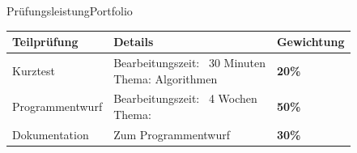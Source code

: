 \begin{frame}{Prüfungsleistung}{Portfolio}
	\begin{tabularx}{\textwidth}{|l|l|l|}
		\hline
		\textbf{Teilprüfung}&\textbf{Details}&\textbf{Gewichtung}\\
		\hline
		Kurztest&\makecell{Bearbeitungszeit: ~30 Minuten \\ Thema: Algorithmen} & \textbf{20\%}\\
		\hline
		Programmentwurf&\makecell{Bearbeitungszeit: ~4 Wochen \\ Thema: } & \textbf{50\%}\\
		\hline
		Dokumentation&Zum Programmentwurf&\textbf{30\%}\\
		\hline
	\end{tabularx}
\end{frame}